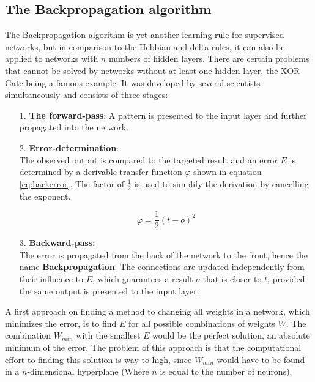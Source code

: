 \documentclass[10pt,a4paper,DIV=11]{scrreprt}
\begin{document}
\subsection{The Backpropagation algorithm}

The Backpropagation algorithm is yet another learning rule for supervised networks, but in comparison to the Hebbian and delta rules, it can also 
be applied to networks with $n$ numbers of hidden layers. There are certain problems that cannot be solved by networks without at least one 
hidden layer, the XOR-Gate being a famous example. It was developed by several scientists simultaneously \cite{BACK1}\cite{BACK2}\cite{BACK3} and 
consists of three stages:
\begin{itemize}
\item[1.] \textbf{The forward-pass}:
A pattern is presented to the input layer and further propagated into the network.
\item[2.] \textbf{Error-determination}:\\
The observed output is compared to the targeted result and an error $E$ is determined by a derivable transfer function $\varphi$ shown in equation 
\eqref{eq:backerror}. The factor of $\frac{1}{2}$ is used to simplify the derivation by cancelling the exponent.

\begin{equation}
\varphi = \frac{1}{2} (t-o)^2
\label{eq:backerror}
\end{equation}
\item[3.] \textbf{Backward-pass}:\\
The error is propagated from the back of the network to the front, hence the name \textbf{Backpropagation}. The connections are updated independently 
from their influence to $E$, which guarantees a result $o$ that is closer to $t$, provided the same output is presented to the input layer.
\end{itemize}

A first approach on finding a method to changing all weights in a network, which minimizes the error, is to find $E$ for all possible combinations 
of weights $W$. The combination $W_{min}$ with the smallest $E$ would be the perfect solution, an absolute minimum of the error. The problem of this 
approach is that the computational effort to finding this solution is way to high, since $W_{min}$ would have to be found in a $n$-dimensional 
hyperplane (Where $n$ is equal to the number of neurons).\\
\end{document}
